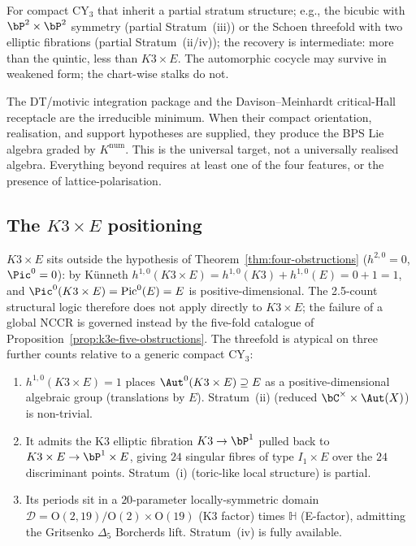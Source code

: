 \begin{remark}
\label{rem:generic-compact}
For compact CY$_3$ that inherit a partial stratum structure; e.g.,
the bicubic with $\bP^2 \times \bP^2$ symmetry (partial Stratum~(iii))
or the Schoen threefold with two elliptic fibrations (partial
Stratum~(ii/iv)); the recovery is intermediate: more than the
quintic, less than $K3 \times E$. The automorphic cocycle may survive
in weakened form; the chart-wise stalks do not.

The DT/motivic integration package and the Davison--Meinhardt
critical-Hall receptacle are the irreducible minimum. When their
compact orientation, realisation, and support hypotheses are supplied,
they produce the BPS Lie algebra graded by $K^{\mathrm{num}}$. This is
the universal target, not a universally realised algebra. Everything
beyond requires at least one of the four features, or the presence of
lattice-polarisation.
\end{remark}
\subsection{The $K3 \times E$ positioning}
\label{sec:k3e-positioning}

$K3 \times E$ sits outside the hypothesis of
Theorem~\ref{thm:four-obstructions} ($h^{2,0} = 0$, $\Pic^0 = 0$): by
Künneth $h^{1,0}(K3 \times E) = h^{1,0}(K3) + h^{1,0}(E) = 0 + 1 = 1$,
and $\Pic^0(K3 \times E) = \mathrm{Pic}^0(E) = E$ is positive-dimensional.
The 2.5-count structural logic therefore does not apply directly to
$K3 \times E$; the failure of a global NCCR is governed instead by the
five-fold catalogue of Proposition~\ref{prop:k3e-five-obstructions}. The
threefold is atypical on three further counts relative to a generic
compact CY$_3$:

\begin{enumerate}[leftmargin=2em]
\item $h^{1,0}(K3 \times E) = 1$ places $\Aut^0(K3\times E) \supseteq E$
 as a positive-dimensional algebraic group (translations by $E$).
 Stratum~(ii) (reduced $\bC^\times \times \Aut(X)$) is non-trivial.
\item It admits the K3 elliptic fibration $K3 \to \bP^1$ pulled back to
 $K3 \times E \to \bP^1 \times E$, giving $24$ singular fibres of type
 $I_1 \times E$ over the $24$ discriminant points. Stratum~(i)
 (toric-like local structure) is partial.
\item Its periods sit in a $20$-parameter locally-symmetric domain
 $\mathcal{D} = \mathrm{O}(2,19) / \mathrm{O}(2) \times \mathrm{O}(19)$
 (K3 factor) times $\mathbb{H}$ (E-factor), admitting the
 Gritsenko $\Delta_5$ Borcherds lift. Stratum~(iv) is fully available.
\end{enumerate}

